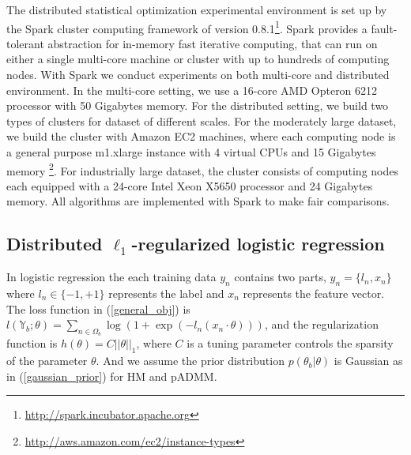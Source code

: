 \documentclass{article}
\newcommand{\1}[0]{\ensuremath{\boldsymbol{1}}\xspace}
\begin{document}
The distributed statistical optimization experimental environment is set up by the Spark cluster computing framework \cite{Zaharia2010} of version 0.8.1\footnote{\url{http://spark.incubator.apache.org}}. Spark provides a fault-tolerant abstraction for in-memory fast iterative computing, that can run on either a single multi-core machine or cluster with up to hundreds of computing nodes. With Spark we conduct experiments on both multi-core and distributed environment. In the multi-core setting, we use a 16-core AMD Opteron 6212 processor with 50 Gigabytes memory. For the distributed setting, we build two types of clusters for dataset of different scales. For the moderately large dataset, we build the cluster with Amazon EC2 machines, where each computing node is a general purpose m1.xlarge instance with 4 virtual CPUs and 15 Gigabytes memory \footnote{\url{http://aws.amazon.com/ec2/instance-types}}. For industrially large dataset, the cluster consists of computing nodes each equipped with a 24-core Intel Xeon X5650 processor and 24 Gigabytes memory. All algorithms are implemented with Spark to make fair comparisons.

\subsection{Distributed $\ell_1$-regularized logistic regression}
In logistic regression the each training data $y_n$ contains two parts, $y_n = \{l_n, x_n\}$ where $l_n \in \{-1, +1\}$ represents the label and $x_n$ represents the feature vector. The loss function in (\ref{general_obj}) is $l(\mathbb{Y}_b; \theta) = \sum_{n\in\Omega_b}\log(1+\exp(-l_n(x_n\cdot\theta)))$, and the regularization function is $h(\theta) = C||\theta||_1$, where $C$ is a tuning parameter controls the sparsity of the parameter $\theta$. And we assume the prior distribution $p(\theta_b|\theta)$ is Gaussian as in (\ref{gaussian_prior}) for HM and pADMM. 
\end{document}
